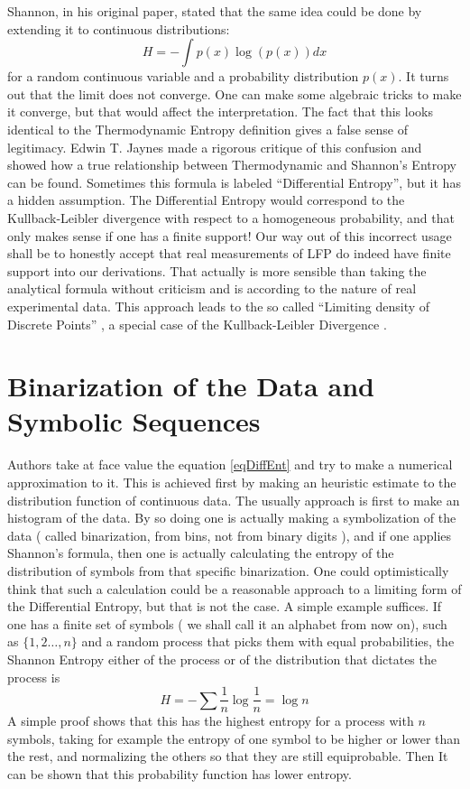 \documentclass{article}
\begin{document}
Shannon, in his original paper, stated that the same idea could be done by extending it to continuous distributions:
\begin{equation}
H=-\int p(x) \log (p(x)) d x
\end{equation}
for a random continuous variable and a probability distribution $p(x)$. It turns out that the limit does not converge. One can make some algebraic tricks to make it converge, but that would affect the interpretation. The fact that this looks identical to the Thermodynamic Entropy definition gives a false sense of legitimacy. Edwin T. Jaynes \cite{Jaynes1957}  made a rigorous critique of this confusion and showed how a true relationship between Thermodynamic and Shannon's Entropy can be found. Sometimes this formula is
labeled ``Differential Entropy'', but it has a hidden assumption.
The Differential Entropy would correspond to the Kullback-Leibler divergence
with respect to a homogeneous probability, and that only makes sense if one
has a finite support!
Our way out of this incorrect usage shall be to honestly accept that real measurements
of LFP do indeed have finite support into our derivations. That actually is more sensible than taking the analytical formula without criticism and is according to the nature of real experimental data. This approach leads to the so called ``Limiting density
of Discrete Points'' \cite{Jaynes1968, Jaynes2003}, a special case of the
Kullback-Leibler Divergence \cite{Kullback1959}.


\section{Binarization of the Data and Symbolic Sequences}

Authors take at face value the equation \ref{eqDiffEnt} and try to make a numerical approximation to it. This is achieved first by making an heuristic estimate to the distribution function of continuous data. The usually approach is first to make an histogram of the data. By so doing one is actually making a symbolization of the data ( called binarization, from bins, not from binary digits ), and if one applies Shannon's formula, then one is actually calculating the entropy of the distribution of symbols from that specific binarization. One could optimistically think that such a calculation could be a reasonable approach to a limiting form of the Differential Entropy, but that is not the case. A simple example suffices.
If one has a finite set of symbols ( we shall call it an alphabet from now on), such as $\{1,2\ldots,n\}$ and a random process that picks them with equal probabilities, the Shannon Entropy either of the process or of the distribution that dictates the process is 
$$
H=-\sum \frac{1}{n} \log \frac{1}{n} = \log n
$$
A simple proof shows that this has the highest entropy for a process with $n$ symbols, taking for example the entropy of one symbol to be higher or lower than the rest, and normalizing the others so that they are still equiprobable. Then It can be shown that this probability function has lower entropy. 
\end{document}
